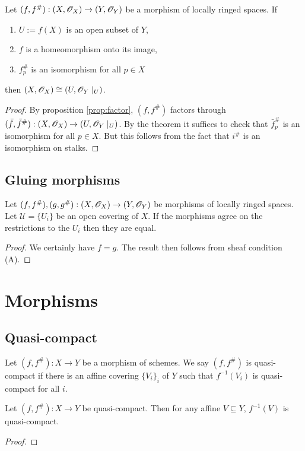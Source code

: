 \documentclass{memoir}
\begin{document}
\begin{corollary}
    Let $(f,f^\#):(X,\mathscr{O}_X)\to (Y,\mathscr{O}_Y)$ be a morphism of locally ringed spaces.
    If 
    \begin{enumerate}
        \item $U:=f(X)$ is an open subset of $Y$,
        \item $f$ is a homeomorphism onto its image,
        \item $f^\#_p$ is an isomorphism for all $p\in X$
    \end{enumerate}
    then $(X,\mathscr{O}_X)\cong (U,\mathscr{O}_Y\mid_U)$.
\end{corollary}
\begin{proof}
    By proposition \ref{prop:factor}, $(f,f^\#)$ factors through $(\bar f,\bar f^\#):(X,\mathscr{O}_X)\to (U,\mathscr{O}_Y\mid_U)$.
    By the theorem it suffices to check that $\bar f^\#_p$ is an isomorphism for all $p\in X$.
    But this follows from the fact that $i^\#$ is an isomorphism on stalks.
\end{proof}
\subsection{Gluing morphisms}
\begin{lemma}
    Let $(f,f^\#),(g,g^\#):(X,\mathscr{O}_X)\to (Y,\mathscr{O}_Y)$ be morphisms of locally ringed spaces.
    Let $\mathcal U = \{U_i\}$ be an open covering of $X$.
    If the morphisms agree on the restrictions to the $U_i$ then they are equal.
\end{lemma}
\begin{proof}
    We certainly have $f = g$.
    The result then follows from sheaf condition (A).
\end{proof}
\section{Morphisms}
\subsection{Quasi-compact}
\begin{definition}
    Let $(f,f^\#):X\to Y$ be a morphism of schemes.
    We say $(f,f^\#)$ is quasi-compact if there is an affine covering $\{V_i\}_i$ of $Y$ such that $f^{-1}(V_i)$ is quasi-compact for all $i$.
\end{definition}
\begin{proposition}
    Let $(f,f^\#):X\to Y$ be quasi-compact.
    Then for any affine $V\subseteq Y$, $f^{-1}(V)$ is quasi-compact.
\end{proposition}
\begin{proof}

\end{proof}
\end{document}
